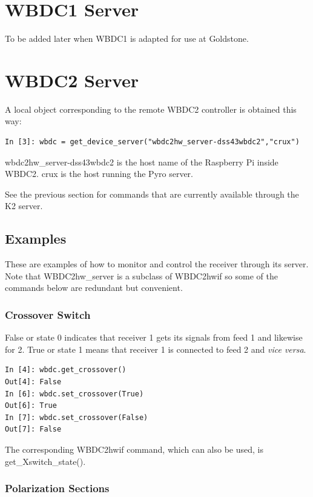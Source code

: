 \documentclass[letterpaper,11pt]{book}
\begin{document}
\section{WBDC1 Server}

To be added later when WBDC1 is adapted for use at Goldstone.

\section{WBDC2 Server}

A local object corresponding to the remote WBDC2 controller is obtained this
way:
\begin{verbatim}
In [3]: wbdc = get_device_server("wbdc2hw_server-dss43wbdc2","crux")
\end{verbatim}
{\ttfamily wbdc2hw\_server-dss43wbdc2} is the host name of the Raspberry Pi
inside WBDC2.  {\ttfamily crux} is the host running the Pyro server.

See the previous section for commands that are currently available through the
K2 server.
           

\subsection{Examples}

These are examples of how to monitor and control the receiver through its
server.  Note that {\ttfamily WBDC2hw\_server} is a subclass of
{\ttfamily WBDC2hwif} so some of the commands below are redundant but
convenient.

\subsubsection{Crossover Switch}

{\ttfamily False} or state 0 indicates that receiver 1 gets its signals from
feed 1 and likewise for 2.  {\ttfamily True} or state 1 means that receiver
1 is connected to feed 2 and {\itshape vice versa}.
\begin{verbatim}
In [4]: wbdc.get_crossover()
Out[4]: False
In [6]: wbdc.set_crossover(True)
Out[6]: True
In [7]: wbdc.set_crossover(False)
Out[7]: False\end{verbatim}
The corresponding {\ttfamily WBDC2hwif} command, which can also be used,
is {\ttfamily get\_Xswitch\_state()}.

\subsubsection{Polarization Sections}
\end{document}
